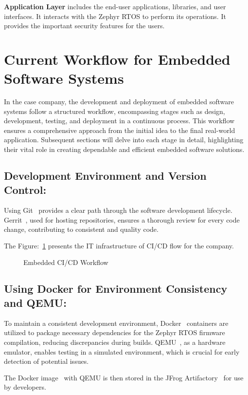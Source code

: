 \textbf{Application Layer} includes the end-user applications, libraries, and
user interfaces. It interacts with the Zephyr RTOS to perform its operations. It provides the
important security features for the users.

\section{Current Workflow for Embedded Software Systems}
In the case company, the development and deployment of embedded software systems
follow a structured workflow, encompassing stages such as design, development,
testing, and deployment in a continuous process. This workflow ensures a comprehensive approach from the
initial idea to the final real-world application. Subsequent sections will delve
into each stage in detail, highlighting their vital role in creating dependable
and efficient embedded software solutions.

\subsection*{Development Environment and Version Control:} Using
Git~\cite{loeliger2012version} provides a clear path through the software
development lifecycle. Gerrit~\cite{milanesio2013learning}, used for hosting
repositories, ensures a thorough review for every code change, contributing to
consistent and quality code.

The Figure:~\ref{fig:CI_Infrastrcuture_2} presents the IT infrastructure of CI/CD
flow for the company.

\begin{figure}[H] \centering
{}
\caption{Embedded CI/CD Workflow}\label{fig:CI_Infrastrcuture_2} \end{figure}

\subsection*{Using Docker for Environment Consistency and QEMU:} To maintain a
consistent development environment, Docker~\cite{anderson2015docker} containers
are utilized to package necessary dependencies for the Zephyr RTOS firmware
compilation, reducing discrepancies during builds. QEMU~\cite{bellard2005qemu},
as a hardware emulator, enables testing in a simulated environment, which is
crucial for early detection of potential issues.

The Docker image~\cite{bui2015analysis} with QEMU is then stored in the JFrog
Artifactory~\cite{Artifact8:online} for use by developers.

